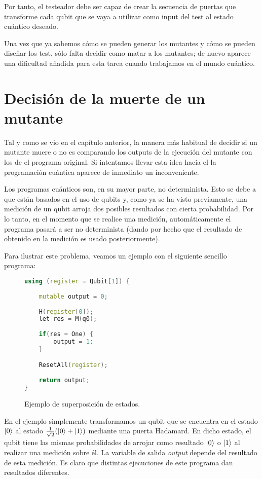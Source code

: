 Por tanto, el testeador debe ser capaz de crear la secuencia de puertas que transforme cada qubit que se vaya a utilizar como input del test al estado cuántico deseado.

Una vez que ya sabemos cómo se pueden generar los mutantes y cómo se pueden diseñar los test, sólo falta decidir como matar a los mutantes; de nuevo aparece una dificultad añadida para esta tarea cuando trabajamos en el mundo cuántico.

\section{Decisión de la muerte de un mutante}

Tal y como se vio en el capítulo anterior, la manera más habitual de decidir si un mutante muere o no es comparando los outputs de la ejecución del mutante con los de el programa original. Si intentamos llevar esta idea hacia el la programación cuántica aparece de inmediato un inconveniente. 

Los programas cuánticos son, en su mayor parte, no determinista. Esto se debe a que están basados en el uso de qubits y, como ya se ha visto previamente, una medición de un qubit arroja dos posibles resultados con cierta probabilidad. Por lo tanto, en el momento que se realice una medición, automáticamente el programa pasará a ser no determinista (dando por hecho que el resultado de obtenido en la medición es usado posteriormente).

Para ilustrar este problema, veamos un ejemplo con el siguiente sencillo programa:
\clearpage

\begin{figure}[htb]
\begin{lstlisting}[language=c++]
using (register = Qubit[1]) {
	
	mutable output = 0; 
	
	H(register[0]);
	let res = M(q0);
	
	if(res = One) {
		output = 1:
	}

	ResetAll(register);
	
	return output;
}
\end{lstlisting}
\caption{Ejemplo de superposición de estados.}
\label{fig:code4}
\end{figure}

En el ejemplo simplemente transformamos un qubit que se encuentra en el estado $\left|0\right\rangle$ al estado $\tfrac{1}{\sqrt{2}}(\left|0\right\rangle+\left|1\right\rangle)$ mediante una puerta Hadamard. En dicho estado, el qubit tiene las mismas probabilidades de arrojar como resultado $\left|0\right\rangle$ o $\left|1\right\rangle$ al realizar una medición sobre él. La variable de salida \textit{output} depende del resultado de esta medición.
Es claro que distintas ejecuciones de este programa dan resultados diferentes.

